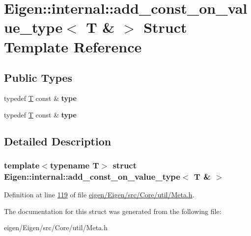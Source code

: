 \hypertarget{struct_eigen_1_1internal_1_1add__const__on__value__type_3_01_t_01_6_01_4}{}\section{Eigen\+:\+:internal\+:\+:add\+\_\+const\+\_\+on\+\_\+value\+\_\+type$<$ T \& $>$ Struct Template Reference}
\label{struct_eigen_1_1internal_1_1add__const__on__value__type_3_01_t_01_6_01_4}
\subsection*{Public Types}
\begin{DoxyCompactItemize}
\item 
\mbox{\label{struct_eigen_1_1internal_1_1add__const__on__value__type_3_01_t_01_6_01_4_a3a45336c12c506a624f49fef7cdb751c}} 
typedef \hyperlink{group___sparse_core___module}{T} const  \& {\bfseries type}
\item 
\mbox{\label{struct_eigen_1_1internal_1_1add__const__on__value__type_3_01_t_01_6_01_4_a3a45336c12c506a624f49fef7cdb751c}} 
typedef \hyperlink{group___sparse_core___module}{T} const  \& {\bfseries type}
\end{DoxyCompactItemize}


\subsection{Detailed Description}
\subsubsection*{template$<$typename T$>$\newline
struct Eigen\+::internal\+::add\+\_\+const\+\_\+on\+\_\+value\+\_\+type$<$ T \& $>$}



Definition at line \hyperlink{eigen_2_eigen_2src_2_core_2util_2_meta_8h_source_l00119}{119} of file \hyperlink{eigen_2_eigen_2src_2_core_2util_2_meta_8h_source}{eigen/\+Eigen/src/\+Core/util/\+Meta.\+h}.



The documentation for this struct was generated from the following file\+:\begin{DoxyCompactItemize}
\item 
eigen/\+Eigen/src/\+Core/util/\+Meta.\+h\end{DoxyCompactItemize}
